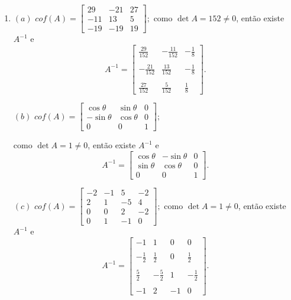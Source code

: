 \documentclass{report}
\begin{document}
\begin{enumerate}
\item $(a)$ $cof(A)=\left[
\begin{array}{rrr}
29 & -21 & 27 \\
-11 & 13 & 5 \\
-19 & -19 & 19
\end{array}
\right];$ como $\det A = 152 \ne 0$, então existe $A^{-1}$ e
$$A^{-1}=\left[
\begin{array}{rrr}
\frac{29}{152} & -\frac{11}{152} & -\frac{1}{8}\\
& & \\
-\frac{21}{152} & \frac{13}{152} & -\frac{1}{8} \\
& & \\
\frac{27}{152} & \frac{5}{152} & \frac{1}{8}
\end{array}
\right].$$

$(b)$ 
$
cof(A)=\left[
\begin{array}{rrr}
\cos \theta  & \sin\theta  & 0 \\
-\sin\theta  & \cos \theta  & 0 \\
0 & 0 & 1
\end{array}
\right];$ 

como $\det A = 1 \ne 0$, então existe $A^{-1}$ e
$$A^{-1}=\left[
\begin{array}{rrr}
\cos \theta  & -\sin\theta  & 0 \\
\sin\theta  & \cos \theta  & 0 \\
0 & 0 & 1
\end{array}
\right].$$

\bigskip

$(c)$ $cof(A)=\left[
\begin{array}{rrrr}
-2 & -1 & 5 & -2 \\
2 & 1 & -5 & 4 \\
0 & 0 & 2 & -2 \\
0 & 1 & -1 & 0
\end{array}
\right];$  como $\det A = 1 \ne 0$, então existe $A^{-1}$ e
$$A^{-1}=\left[
\begin{array}{rrrr}
-1 &  1& 0 & 0 \\
& & & \\
-\frac{1}{2} & \frac{1}{2} & 0 & \frac{1}{2} \\
& & &\\
\frac{5}{2} & -\frac{5}{2} & 1 & -\frac{1}{2} \\
& & &\\
-1 & 2 & -1 & 0
\end{array}
\right].$$


\end{enumerate}
\end{document}
